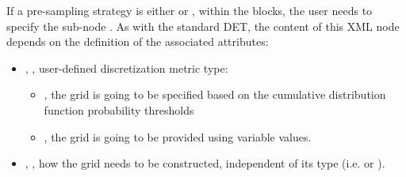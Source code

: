 If a pre-sampling strategy  is either  or 
, within the  blocks, the user needs to 
specify the sub-node .
%
As with the standard DET, the content of this XML node depends on the definition
of the associated attributes:
\begin{itemize}
\itemsep0em
\item {}, , user-defined
  discretization metric type:
  \begin{itemize}
    \item {}, the grid is going to be specified based on the 
      cumulative distribution function probability thresholds
    \item {}, the grid is going to be provided using variable
      values.
  \end{itemize}
  \item {}, , how the 
    grid needs to be constructed, independent of its type (i.e.  
    or ).
\end{itemize}
\constructionGridDescription

